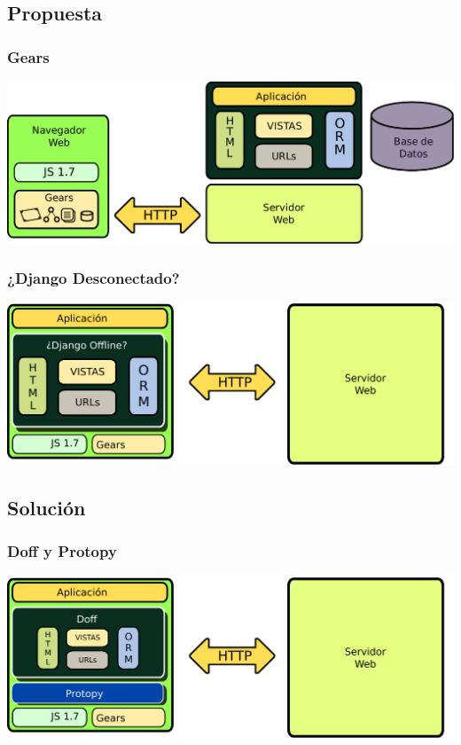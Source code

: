 \documentclass{beamer}
\begin{document}
\subsection{Propuesta}
\begin{frame}
    \frametitle{Gears}
    \includegraphics[scale=0.5]{fw_django_comp_gears.pdf}
\end{frame}

\begin{frame}
    \frametitle{¿Django Desconectado?}
    \includegraphics[scale=0.5]{fw_desconectado.pdf}
\end{frame}

\subsection{Solución}
\begin{frame}
    \frametitle{Doff y Protopy}
    \includegraphics[scale=0.5]{fw_doff_protopy.pdf}
\end{frame}
\end{document}
